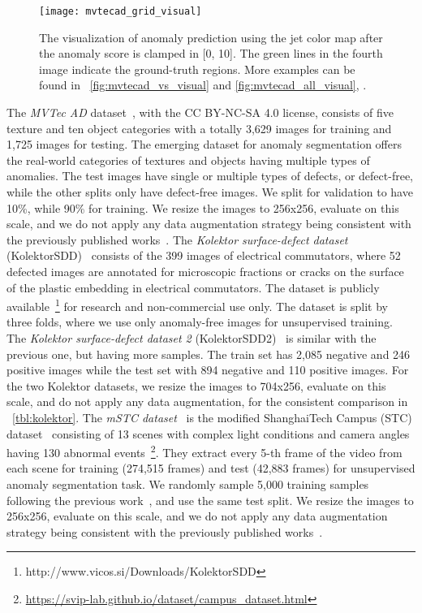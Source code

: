 \begin{figure}[t!]
    \begin{center}
        \texttt{[image: mvtecad\_grid\_visual]}
    \end{center}
    \caption{The visualization of anomaly prediction using the jet color map after the anomaly score is clamped in [0, 10]. The green lines in the fourth image indicate the ground-truth regions. More examples can be found in \fig~\ref{fig:mvtecad_vs_visual} and \ref{fig:mvtecad_all_visual}, \appx.}
    \label{fig:mvtecad_grid_visual}
\end{figure}

 The \textit{MVTec AD} dataset~\cite{Bergmann2019}, with the CC BY-NC-SA 4.0 license, consists of five texture and ten object categories with a totally 3,629 images for training and 1,725 images for testing. 
The emerging dataset for anomaly segmentation offers the real-world categories of textures and objects having multiple types of anomalies.
The test images have single or multiple types of defects, or defect-free, while the other splits only have defect-free images. We split for validation to have 10\%, while 90\% for training. We resize the images to 256x256, evaluate on this scale, and we do not apply any data augmentation strategy being consistent with the previously published works~\cite{Bergmann2019,Bergmann2020}.
The \textit{Kolektor surface-defect dataset} (KolektorSDD)~\cite{Tabernik2019JIM} consists of the 399 images of electrical commutators, where 52 defected images are annotated for microscopic fractions or cracks on the surface of the plastic embedding in electrical commutators. The dataset is publicly available~\footnote{http://www.vicos.si/Downloads/KolektorSDD} for research and non-commercial use only.
The dataset is split by three folds, where we use only anomaly-free images for unsupervised training. 
The \textit{Kolektor surface-defect dataset 2} (KolektorSDD2)~\cite{Bozic2021COMIND} is similar with the previous one, but having more samples. The train set has 2,085 negative and 246 positive images while the test set with 894 negative and 110 positive images. For the two Kolektor datasets, we resize the images to 704x256, evaluate on this scale, and do not apply any data augmentation, for the consistent comparison in \tbl~\ref{tbl:kolektor}.
The \textit{mSTC dataset}~\cite{Venkataramanan2020} is the modified ShanghaiTech Campus (STC) dataset~\cite{liu2018stc} consisting of 13 scenes with complex light conditions and camera angles having 130 abnormal events~\footnote{\url{https://svip-lab.github.io/dataset/campus_dataset.html}}. They extract every 5-th frame of the video from each scene for training (274,515 frames) and test (42,883 frames) for unsupervised anomaly segmentation task. We randomly sample 5,000 training samples following the previous work~\cite{Defard2020}, and use the same test split. We resize the images to 256x256, evaluate on this scale, and we do not apply any data augmentation strategy being consistent with the previously published works~\cite{Venkataramanan2020,Cohen2020,Defard2020}.

